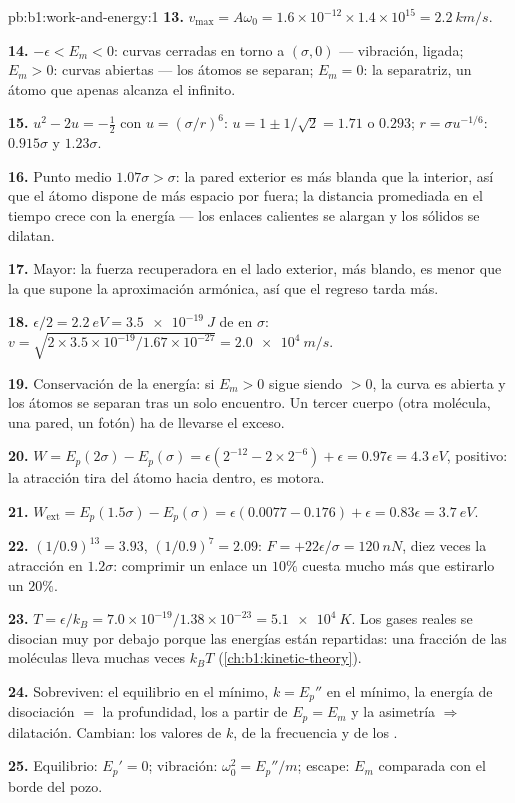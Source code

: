 \begin{solution}{pb:b1:work-and-energy:1}
\textbf{13.} $v_{\max} = A\omega_0 = 1.6\times10^{-12} \times 1.4\times10^{15}
= \qty{2.2}{km/s}$.

\textbf{14.} $-\epsilon < E_m < 0$: curvas cerradas en torno a $(\sigma, 0)$
--- vibración, ligada; $E_m > 0$: curvas abiertas --- los átomos se
separan; $E_m = 0$: la separatriz, un átomo que apenas alcanza el infinito.

\textbf{15.} $u^2 - 2u = -\tfrac12$ con $u = (\sigma/r)^6$: $u = 1 \pm 1/\sqrt2
= 1.71$ o $0.293$; $r = \sigma u^{-1/6}$: $0.915\sigma$ y $1.23\sigma$.

\textbf{16.} Punto medio $1.07\sigma > \sigma$: la pared exterior es más
blanda que la interior, así que el átomo dispone de más espacio por fuera;
la distancia promediada en el tiempo crece con la energía --- los enlaces
calientes se alargan y los sólidos se dilatan.

\textbf{17.} Mayor: la fuerza recuperadora en el lado exterior, más
blando, es menor que la que supone la aproximación armónica, así que el
regreso tarda más.

\textbf{18.} $\epsilon/2 = \qty{2.2}{eV} = \qty{3.5e-19}{J}$ de  en $\sigma$: $v = \sqrt{2 \times 3.5\times10^{-19}/1.67\times10^{-27}}
= \qty{2.0e4}{m/s}$.

\textbf{19.} Conservación de la energía: si $E_m > 0$ sigue siendo $> 0$,
la curva es abierta y los átomos se separan tras un solo encuentro. Un
tercer cuerpo (otra molécula, una pared, un fotón) ha de llevarse el exceso.

\textbf{20.} $W = E_p(2\sigma) - E_p(\sigma) = \epsilon(2^{-12} - 2 \times 2^{-6})
+ \epsilon = 0.97\epsilon = \qty{4.3}{eV}$, positivo: la atracción tira del
átomo hacia dentro, es motora.

\textbf{21.} $W_{\text{ext}} = E_p(1.5\sigma) - E_p(\sigma) = \epsilon(0.0077 -
0.176) + \epsilon = 0.83\epsilon = \qty{3.7}{eV}$.

\textbf{22.} $(1/0.9)^{13} = 3.93$, $(1/0.9)^7 = 2.09$: $F = +22\epsilon/\sigma
= \qty{+120}{nN}$, diez veces la atracción en $1.2\sigma$: comprimir un
enlace un $10\%$ cuesta mucho más que estirarlo un $20\%$.

\textbf{23.} $T = \epsilon/k_B = 7.0\times10^{-19}/1.38\times10^{-23} =
\qty{5.1e4}{K}$. Los gases reales se disocian muy por debajo porque las
energías están repartidas: una fracción de las moléculas lleva muchas
veces $k_BT$ (\cref{ch:b1:kinetic-theory}).

\textbf{24.} Sobreviven: el equilibrio en el mínimo, $k = E_p''$ en el
mínimo, la energía de disociación $=$ la profundidad, los  a partir de $E_p = E_m$ y la asimetría $\Rightarrow$ dilatación.
Cambian: los valores de $k$, de la frecuencia y de los .

\textbf{25.} Equilibrio: $E_p' = 0$; vibración: $\omega_0^2 = E_p''/m$;
escape: $E_m$ comparada con el borde del pozo.
\end{solution}
